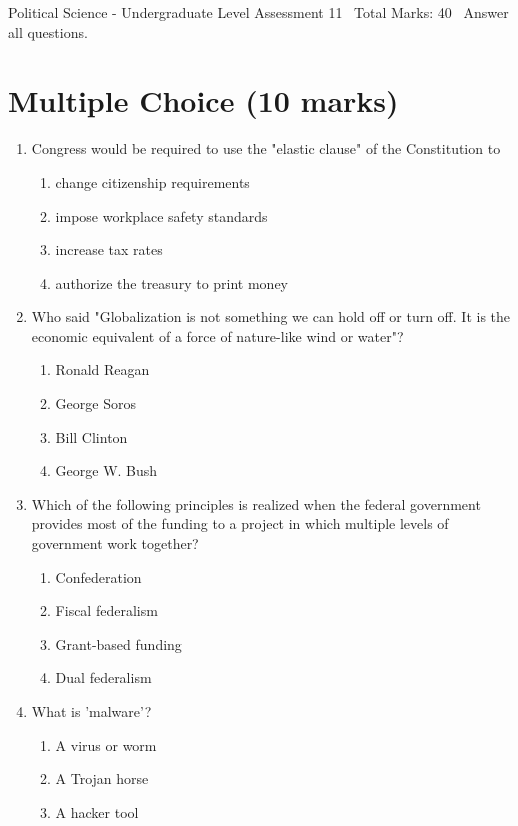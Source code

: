 \documentclass[12pt]{article}
\begin{document}
\begin{center}
Political Science - Undergraduate Level Assessment 11 \
Total Marks: 40 \
Answer all questions.
\end{center}

\section*{Multiple Choice (10 marks)}
\begin{enumerate}[label=\arabic*.]
\item Congress would be required to use the "elastic clause" of the Constitution to
\begin{enumerate}[label=(\alph*)]
    \item change citizenship requirements
    \item impose workplace safety standards
    \item increase tax rates
    \item authorize the treasury to print money
\end{enumerate}
\item Who said "Globalization is not something we can hold off or turn off. It is the economic equivalent of a force of nature-like wind or water"?
\begin{enumerate}[label=(\alph*)]
    \item Ronald Reagan
    \item George Soros
    \item Bill Clinton
    \item George W. Bush
\end{enumerate}
\item Which of the following principles is realized when the federal government provides most of the funding to a project in which multiple levels of government work together?
\begin{enumerate}[label=(\alph*)]
    \item Confederation
    \item Fiscal federalism
    \item Grant-based funding
    \item Dual federalism
\end{enumerate}
\item What is 'malware'?
\begin{enumerate}[label=(\alph*)]
    \item A virus or worm
    \item A Trojan horse
    \item A hacker tool

\end{enumerate}
\end{enumerate}
\end{document}
